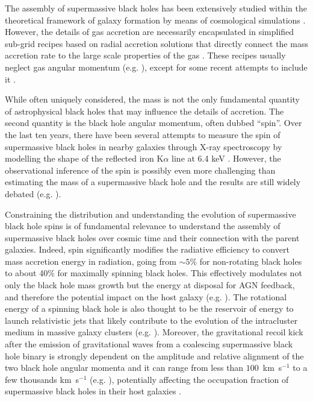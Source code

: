 \documentclass[a4paper,fleqn,usenatbib]{mnras}
\begin{document}
The assembly of supermassive black holes has been extensively studied within the theoretical framework of galaxy formation by means of cosmological simulations \citep{sijacki+07, dimatteo+12, sijacki+15, rosasguevara+16,volonteri+16, weinberger+17}.
However, the details of gas accretion are necessarily encapsulated in simplified sub-grid recipes based on radial accretion solutions that directly connect the mass accretion rate to the large scale properties of the gas \citep{hoyle+41,bondi+52}.
These recipes usually neglect gas angular momentum (e.g. \citealt{booth+09,biernacki+17}), except for some recent attempts to include it \citep{angles-alcazar+13,angles-alcazar+15,rosasguevara+15,curtis+16b}.

While often uniquely considered, the mass is not the only fundamental quantity of astrophysical black holes that may influence the details of accretion.
The second quantity is the black hole angular momentum, often dubbed ``spin''.
Over the last ten years, there have been several attempts to measure the spin of supermassive black holes in nearby galaxies through X-ray spectroscopy by modelling the shape of the reflected iron K$\alpha$ line at 6.4 keV \citep{fabian+00}.
However, the observational inference of the spin is possibly even more challenging than estimating the mass of a supermassive black hole and the results are still widely debated (e.g. \citealt{brenneman+06,schmoll+09,delacalleperez+10,patrick+11,brenneman+13,reynolds+14}).

Constraining the distribution and understanding the evolution of supermassive black hole spins is of fundamental relevance to understand the assembly of supermassive black holes over cosmic time and their connection with the parent galaxies.
Indeed, spin significantly modifies the radiative efficiency to convert mass accretion energy in radiation, going from $\sim 5\%$ for non-rotating black holes to about 40\% for maximally spinning black holes.
This effectively modulates not only the black hole mass growth but the energy at disposal for AGN feedback, and therefore the potential impact on the host galaxy (e.g. \citealt{king+06, sijacki+09}).
The rotational energy of a spinning black hole is also thought to be the reservoir of energy to launch relativistic jets that likely contribute to the evolution of the intracluster
medium in massive galaxy clusters (e.g. \citealt{blandford+77,tchekhovskoy+11,fabian+12}).
Moreover, the gravitational recoil kick after the emission of gravitational waves from a coalescing supermassive black hole binary is strongly dependent on the amplitude and relative alignment of the two black hole angular momenta and it can range from less than $100$~km~s$^{-1}$ to a few thousands km~s$^{-1}$ (e.g. \citealt{schnittman+07,baker+08,lousto+12}), potentially affecting the occupation fraction of supermassive black holes in their host galaxies \citep{schnittman+07b,sijacki+09,volonteri+10,gerosa+15}. 
\end{document}
